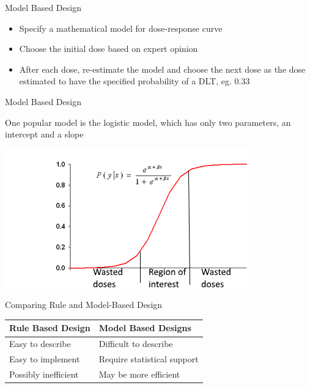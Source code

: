\documentclass{beamer}
\begin{document}
\begin{frame}{Model Based Design}

\begin{itemize}
\itemsep1pt\parskip0pt
\item
  Specify a mathematical model for dose-response curve
\item
  Choose the initial dose based on expert opinion
\item
  After each dose, re-estimate the model and choose the next dose as the
  dose estimated to have the specified probability of a DLT, eg. 0.33
\end{itemize}

\end{frame}

\begin{frame}{Model Based Design}

One popular model is the {logistic model}, which has only two
parameters, an intercept and a slope

\begin{center}\includegraphics[scale=1.2]{images/logisticRegression.png} \end{center}


\end{frame}

\begin{frame}{Comparing Rule and Model-Based Design}

\begin{longtable}[c]{@{}ll@{}}
\toprule
Rule Based Design & Model Based Designs\tabularnewline
\midrule
\endhead
Easy to describe & Difficult to describe\tabularnewline
Easy to implement & Require statistical support\tabularnewline
Possibly inefficient & May be more efficient\tabularnewline
\bottomrule
\end{longtable}

\end{frame}
\end{document}
